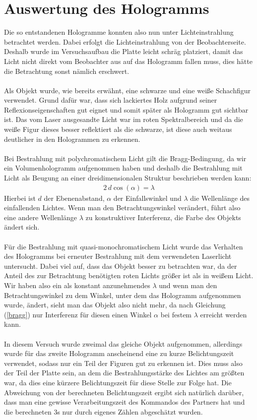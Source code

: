 \documentclass[german,  %
parskip=full,  %
]{scrartcl}
\begin{document}
\section{Auswertung des Hologramms}
Die so entstandenen Hologramme konnten also nun unter Lichteinstrahlung betrachtet werden. Dabei erfolgt die Lichteinstrahlung von der Beobachterseite. Deshalb wurde im Versuchsaufbau die Platte leicht schräg platziert, damit das Licht nicht direkt vom Beobachter aus auf das Hologramm fallen muss, dies hätte die Betrachtung sonst nämlich erschwert.
\\\\
Als Objekt wurde, wie bereits erwähnt, eine schwarze und eine weiße Schachfigur verwendet. Grund dafür war, dass sich lackiertes Holz aufgrund seiner Reflexionseigenschaften gut eignet und somit später als Hologramm gut sichtbar ist. Das vom Laser ausgesandte Licht war im roten Spektralbereich und da die weiße Figur dieses besser reflektiert als die schwarze, ist diese auch weitaus deutlicher in den Hologrammen zu erkennen. 
\\\\
Bei Bestrahlung mit polychromatischem Licht gilt die Bragg-Bedingung, da wir ein Volumenhologramm aufgenommen haben und deshalb die Bestrahlung mit Licht als Beugung an einer dreidimensionalen Struktur beschrieben werden kann:
\begin{align}
\label{bragg} 2\, d \cos(\alpha) = \lambda
\end{align}
Hierbei ist $d$ der Ebenenabstand, $\alpha$ der Einfallswinkel und $\lambda$ die Wellenlänge des einfallenden Lichtes. Wenn man den Betrachtungswinkel verändert, führt also eine andere Wellenlänge $\lambda$ zu konstruktiver Interferenz, die Farbe des Objekts ändert sich.
\\\\
Für die Bestrahlung mit quasi-monochromatischem Licht wurde das Verhalten des Hologramms bei erneuter Bestrahlung mit dem verwendeten Laserlicht untersucht. Dabei viel auf, dass das Objekt besser zu betrachten war, da der Anteil des zur Betrachtung benötigten roten Lichts größer ist als in weißem Licht. Wir haben also ein als konstant anzunehmendes $\lambda$ und wenn man den Betrachtungswinkel zu dem Winkel, unter dem das Hologramm aufgenommen wurde, ändert, sieht man das Objekt also nicht mehr, da nach Gleichung (\ref{bragg}) nur Interferenz für diesen einen Winkel $\alpha$ bei festem $\lambda$ erreicht werden kann.
\\\\
In diesem Versuch wurde zweimal das gleiche Objekt aufgenommen, allerdings wurde für das zweite Hologramm anscheinend eine zu kurze Belichtungszeit verwendet, sodass nur ein Teil der Figuren gut zu erkennen ist. Dies muss also der Teil der Platte sein, an dem die Bestrahlungsstärke des Lichtes am größten war, da dies eine kürzere Belichtungszeit für diese Stelle zur Folge hat. Die Abweichung von der berechneten Belichtungszeit ergibt sich natürlich darüber, dass man eine gewisse Verarbeitungszeit des Kommandos des Partners hat und die berechneten $3$s nur durch eigenes Zählen abgeschätzt wurden.
\end{document}
